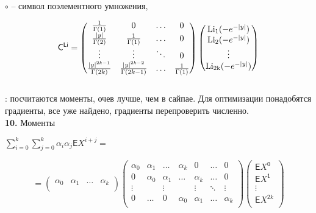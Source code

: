 \documentclass[a4paper,12pt]{article}
\begin{document}
 $\circ$ – символ поэлементного умножения,

\begin{displaymath}
    \mathsf{C^{Li}} =
    \begin{pmatrix}
        1\over{\Gamma(1)} & 0 & \ldots & 0 \\
        |y|\over{\Gamma(2)} & 1\over{\Gamma(1)} & \ldots & 0 \\
        \vdots & \vdots & \ddots & 0 \\
        |y|^{2k - 1}\over{\Gamma(2k)} & |y|^{2k - 2}\over{\Gamma(2k - 1)} & \ldots & 1\over{\Gamma(1)} \\
    \end{pmatrix} \begin{pmatrix}
        \operatorname{Li_1}(-e^{-|y|}) \\ \operatorname{Li_2}(-e^{-|y|}) \\ \vdots \\ \operatorname{Li_{2k}}(-e^{-|y|}) \\
    \end{pmatrix} 
\end{displaymath}\\

: посчитаются моменты, очев лучше, чем в сайпае. Для оптимизации понадобятся градиенты, все уже найдено, градиенты перепроверить численно.\\

\noindent\textbf{10.} Моменты

\begin{center}
    ${\sum\limits_{i = 0}^k}\sum\limits_{j=0}^k\alpha_i \alpha_j \mathsf{E}X^{i + j} = $
\end{center}

\begin{displaymath}
    = \begin{pmatrix}
        \alpha_0 & \alpha_1 & \ldots & \alpha_k \\
    \end{pmatrix} \begin{pmatrix}
        \alpha_0 & \alpha_1 & \ldots & \alpha_k & 0 & \ldots & 0 \\
        0 & \alpha_0 & \alpha_1 & \ldots & \alpha_k & \ldots & 0 \\
        \vdots &  & \vdots &  & \vdots & \ddots & \vdots\\
        0 & \ldots & 0 & \alpha_0 & \alpha_1 &\ldots & \alpha_k \\
    \end{pmatrix} \begin{pmatrix}
        \mathsf{E}X^{\mathsf{0}} \\ \mathsf{E}X^\mathsf{1} \\ \vdots \\ \mathsf{E}X^{\mathsf{2}k} \\
    \end{pmatrix}
\end{displaymath}
\end{document}
